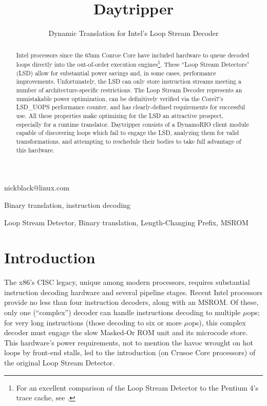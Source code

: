 \documentclass[]{sigplanconf}
\begin{document}

\title{Daytripper}
\subtitle{Dynamic Translation for Intel's Loop Stream Decoder}

           {nickblack@linux.com}

\maketitle

\begin{abstract}
Intel processors since the 65nm Conroe Core
have included hardware to queue decoded loops directly into the out-of-order
execution engines\footnote{For an excellent comparison of the Loop Stream
Detector to the Pentium 4's trace cache, see \cite{kanter}.}. These ``Loop
Stream Detectors'' (LSD) allow for substantial power savings and, in some
cases, performance improvements. Unfortunately, the LSD can only store
instruction streams meeting a number of architecture-specific restrictions.
The Loop Stream Decoder represents an unmistakable power optimization, can be
definitively verified via the Core\texttrademark i7's LSD\_UOPS performance
counter, and has clearly-defined requirements for successful use. All these
properties make optimizing for the LSD an attractive prospect, especially for
a runtime translator. Daytripper consists of a DynamoRIO \cite{dynamorio} client
module capable of discovering loops which fail to engage the LSD, analyzing
them for valid transformations, and attempting to reschedule their bodies to
take full advantage of this hardware.
\end{abstract}


\terms
Binary translation, instruction decoding

\keywords
Loop Stream Detector, Binary translation, Length-Changing Prefix, MSROM

\section{Introduction}
The x86's CISC legacy, unique among modern processors, requires substantial
instruction decoding hardware and several pipeline stages. Recent Intel processors
provide no less than four instruction decoders, along with an MSROM. Of these,
only one (``complex'') decoder can handle instructions decoding to multiple
$\mu$ops; for very long instructions (those decoding to six or more $\mu$ops),
this complex decoder must engage the slow Masked-Or ROM unit and its
microcode store. This hardware's power requirements, not to mention the havoc
wrought on hot loops by front-end stalls, led to the introduction (on Crusoe
Core processors) of the original Loop Stream Detector.
\end{document}
